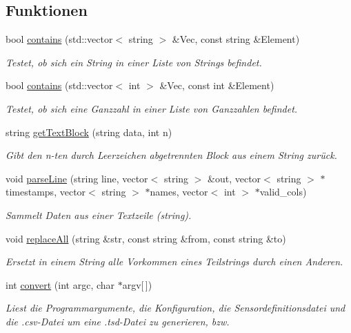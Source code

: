 \subsection*{Funktionen}
\begin{DoxyCompactItemize}
\item 
bool \hyperlink{namespaceCSVToSD_a268ecb11b27ccafb712296ea053c7869}{contains} (std\-::vector$<$ string $>$ \&Vec, const string \&Element)
\begin{DoxyCompactList}\small\item\em Testet, ob sich ein String in einer Liste von Strings befindet. \end{DoxyCompactList}\item 
bool \hyperlink{namespaceCSVToSD_afda229f036fd5340f5ba8becbe1e530a}{contains} (std\-::vector$<$ int $>$ \&Vec, const int \&Element)
\begin{DoxyCompactList}\small\item\em Testet, ob sich eine Ganzzahl in einer Liste von Ganzzahlen befindet. \end{DoxyCompactList}\item 
string \hyperlink{namespaceCSVToSD_aeac9cdcffeca7cf1d8990e27fc2456ce}{get\-Text\-Block} (string data, int n)
\begin{DoxyCompactList}\small\item\em Gibt den n-\/ten durch Leerzeichen abgetrennten Block aus einem String zurück. \end{DoxyCompactList}\item 
void \hyperlink{namespaceCSVToSD_a2e2e7a5141b8cf519db3c37c9b2cc410}{parse\-Line} (string line, vector$<$ string $>$ \&out, vector$<$ string $>$ $\ast$timestamps, vector$<$ string $>$ $\ast$names, vector$<$ int $>$ $\ast$valid\-\_\-cols)
\begin{DoxyCompactList}\small\item\em Sammelt Daten aus einer Textzeile (string). \end{DoxyCompactList}\item 
void \hyperlink{namespaceCSVToSD_a4f125d9c8df307d21dbb5363f6422b4d}{replace\-All} (string \&str, const string \&from, const string \&to)
\begin{DoxyCompactList}\small\item\em Ersetzt in einem String alle Vorkommen eines Teilstrings durch einen Anderen. \end{DoxyCompactList}\item 
int \hyperlink{namespaceCSVToSD_ab24aaf410a1c332e2a84b42af50e5fd9}{convert} (int argc, char $\ast$argv\mbox{[}$\,$\mbox{]})
\begin{DoxyCompactList}\small\item\em Liest die Programmargumente, die Konfiguration, die Sensordefinitionsdatei und die .csv-\/\-Datei um eine .tsd-\/\-Datei zu generieren, bzw. \end{DoxyCompactList}\end{DoxyCompactItemize}
